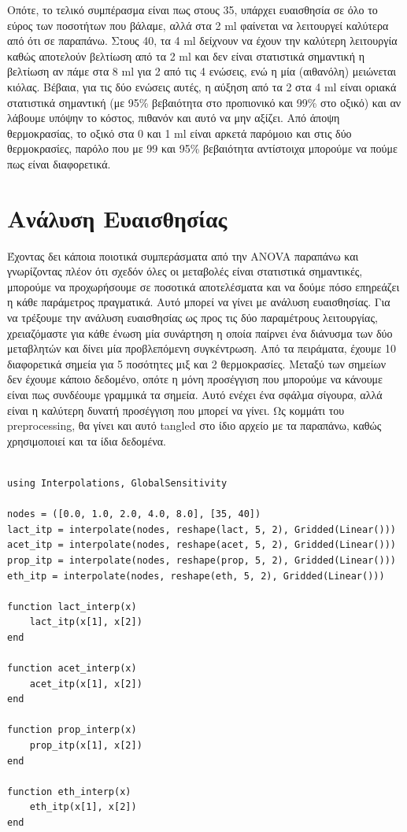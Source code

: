 \documentclass[11pt]{article}
\begin{document}
Οπότε, το τελικό συμπέρασμα είναι πως στους 35, υπάρχει ευαισθησία σε όλο το εύρος των ποσοτήτων που βάλαμε, αλλά στα 2 ml φαίνεται να λειτουργεί καλύτερα από ότι σε παραπάνω. Στους 40, τα 4 ml δείχνουν να έχουν την καλύτερη λειτουργία καθώς αποτελούν βελτίωση από τα 2 ml και δεν είναι στατιστικά σημαντική η βελτίωση αν πάμε στα 8 ml για 2 από τις 4 ενώσεις, ενώ η μία (αιθανόλη) μειώνεται κιόλας. Βέβαια, για τις δύο ενώσεις αυτές, η αύξηση από τα 2 στα 4 ml είναι οριακά στατιστικά σημαντική (με 95\% βεβαιότητα στο προπιονικό και 99\% στο οξικό) και αν λάβουμε υπόψην το κόστος, πιθανόν και αυτό να μην αξίζει. Από άποψη θερμοκρασίας, το οξικό στα 0 και 1 ml είναι αρκετά παρόμοιο και στις δύο θερμοκρασίες, παρόλο που με 99 και 95\% βεβαιότητα αντίστοιχα μπορούμε να πούμε πως είναι διαφορετικά. 

\section{Ανάλυση Ευαισθησίας}
\label{sec:org909b5a6}
Έχοντας δει κάποια ποιοτικά συμπεράσματα από την ANOVA παραπάνω και γνωρίζοντας πλέον ότι σχεδόν όλες οι μεταβολές είναι στατιστικά σημαντικές, μπορούμε να προχωρήσουμε σε ποσοτικά αποτελέσματα και να δούμε πόσο επηρεάζει η κάθε παράμετρος πραγματικά. Αυτό μπορεί να γίνει με ανάλυση ευαισθησίας. Για να τρέξουμε την ανάλυση ευαισθησίας ως προς τις δύο παραμέτρους λειτουργίας, χρειαζόμαστε για κάθε ένωση μία συνάρτηση η οποία παίρνει ένα διάνυσμα των δύο μεταβλητών και δίνει μία προβλεπόμενη συγκέντρωση. Από τα πειράματα, έχουμε 10 διαφορετικά σημεία για 5 ποσότητες μιξ και 2 θερμοκρασίες. Μεταξύ των σημείων δεν έχουμε κάποιο δεδομένο, οπότε η μόνη προσέγγιση που μπορούμε να κάνουμε είναι πως συνδέουμε γραμμικά τα σημεία. Αυτό ενέχει ένα σφάλμα σίγουρα, αλλά είναι η καλύτερη δυνατή προσέγγιση που μπορεί να γίνει. Ως κομμάτι του preprocessing, θα γίνει και αυτό tangled στο ίδιο αρχείο με τα παραπάνω, καθώς χρησιμοποιεί και τα ίδια δεδομένα.

\begin{verbatim}

using Interpolations, GlobalSensitivity

nodes = ([0.0, 1.0, 2.0, 4.0, 8.0], [35, 40])
lact_itp = interpolate(nodes, reshape(lact, 5, 2), Gridded(Linear()))
acet_itp = interpolate(nodes, reshape(acet, 5, 2), Gridded(Linear()))
prop_itp = interpolate(nodes, reshape(prop, 5, 2), Gridded(Linear()))
eth_itp = interpolate(nodes, reshape(eth, 5, 2), Gridded(Linear()))

function lact_interp(x)
    lact_itp(x[1], x[2])
end

function acet_interp(x)
    acet_itp(x[1], x[2])
end

function prop_interp(x)
    prop_itp(x[1], x[2])
end

function eth_interp(x)
    eth_itp(x[1], x[2])
end

\end{verbatim}
\end{document}
